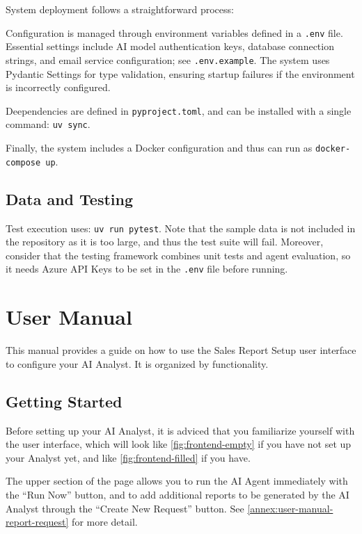 \documentclass[a4paper]{report}
\begin{document}
System deployment follows a straightforward process:

Configuration is managed through environment variables defined in a \texttt{.env} file. Essential settings include AI model authentication keys, database connection strings, and email service configuration; see \texttt{.env.example}. The system uses Pydantic Settings for type validation, ensuring startup failures if the environment is incorrectly configured.

Deependencies are defined in \texttt{pyproject.toml}, and can be installed with a single command: \texttt{uv sync}.

Finally, the system includes a Docker configuration and thus can run as
\texttt{docker-compose up}.

\section{Data and Testing}

Test execution uses: \texttt{uv run pytest}. Note that the sample data is not included in the repository as it is too large, and thus the test suite will fail. Moreover, consider that the testing framework combines unit tests and agent evaluation, so it needs Azure API Keys to be set in the \texttt{.env} file before running.

\chapter{User Manual}

This manual provides a guide on how to use the Sales Report Setup user interface to configure your AI Analyst. It is organized by functionality.

\section{Getting Started}

Before setting up your AI Analyst, it is adviced that you familiarize yourself with the user interface, which will look like \autoref{fig:frontend-empty} if you have not set up your Analyst yet, and like \autoref{fig:frontend-filled} if you have.

The upper section of the page allows you to run the AI Agent immediately with the ``Run Now'' button, and to add additional reports to be generated by the AI Analyst through the ``Create New Request'' button. See \autoref{annex:user-manual-report-request} for more detail.
\end{document}
